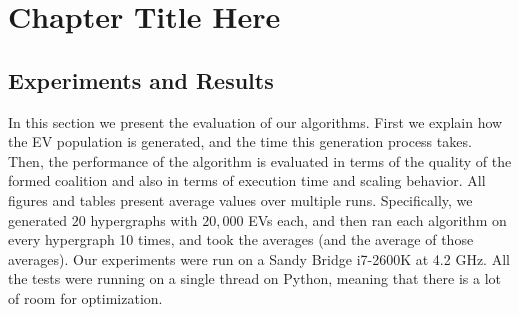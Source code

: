 
\chapter{Chapter Title Here} %

\label{Chapter1} %







\section{Experiments and Results}\label{sec:results}

In this section we present the evaluation of our algorithms. First we explain how the EV population is generated, and the time this generation process takes. Then, the performance of the algorithm is evaluated in terms of the quality of the formed coalition and also in terms of execution time and scaling behavior. All figures and tables present average values over multiple runs. Specifically, we generated $20$ hypergraphs  with $20,000$ EVs each, and then ran each algorithm on every hypergraph 10 times, and took the averages (and the average of those averages).
Our experiments were run on a Sandy Bridge i7-2600K at 4.2 GHz. All the tests were running on a single thread on Python, meaning that there is a lot of room for optimization. %

